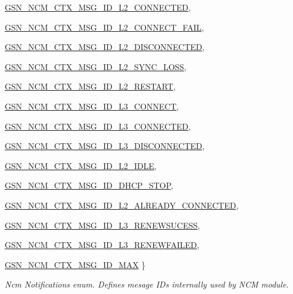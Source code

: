 \begin{DoxyCompactItemize}
\par
\hyperlink{a00688_gga7df8ae3172682e89bfa663208e3f0081ab7c2c3aa92aaa434c756acf574849d7e}{GSN\_\-NCM\_\-CTX\_\-MSG\_\-ID\_\-L2\_\-CONNECTED}, 
\par
\hyperlink{a00688_gga7df8ae3172682e89bfa663208e3f0081a3d625aa8bd3451c5d6756d7ca12a5a72}{GSN\_\-NCM\_\-CTX\_\-MSG\_\-ID\_\-L2\_\-CONNECT\_\-FAIL}, 
\par
\hyperlink{a00688_gga7df8ae3172682e89bfa663208e3f0081a6d6b2708ec053a54a35533ea89b82dbe}{GSN\_\-NCM\_\-CTX\_\-MSG\_\-ID\_\-L2\_\-DISCONNECTED}, 
\par
\hyperlink{a00688_gga7df8ae3172682e89bfa663208e3f0081a6d6969743dec280c81de97facc785085}{GSN\_\-NCM\_\-CTX\_\-MSG\_\-ID\_\-L2\_\-SYNC\_\-LOSS}, 
\par
\hyperlink{a00688_gga7df8ae3172682e89bfa663208e3f0081a5a1bac3915a3dc40cb070e75fdd809a0}{GSN\_\-NCM\_\-CTX\_\-MSG\_\-ID\_\-L2\_\-RESTART}, 
\par
\hyperlink{a00688_gga7df8ae3172682e89bfa663208e3f0081a6f85a2bfe3c47d23f9dd782d433383f4}{GSN\_\-NCM\_\-CTX\_\-MSG\_\-ID\_\-L3\_\-CONNECT}, 
\par
\hyperlink{a00688_gga7df8ae3172682e89bfa663208e3f0081a9645733074e6cf9524c08ecbafe78d78}{GSN\_\-NCM\_\-CTX\_\-MSG\_\-ID\_\-L3\_\-CONNECTED}, 
\par
\hyperlink{a00688_gga7df8ae3172682e89bfa663208e3f0081aab5e02a78811b59d9d996952c346681a}{GSN\_\-NCM\_\-CTX\_\-MSG\_\-ID\_\-L3\_\-DISCONNECTED}, 
\par
\hyperlink{a00688_gga7df8ae3172682e89bfa663208e3f0081a1a6bf8dbcf5fd9f73baedb3d92f37810}{GSN\_\-NCM\_\-CTX\_\-MSG\_\-ID\_\-L2\_\-IDLE}, 
\par
\hyperlink{a00688_gga7df8ae3172682e89bfa663208e3f0081ac37700bd992d190df8dfbe400d904996}{GSN\_\-NCM\_\-CTX\_\-MSG\_\-ID\_\-DHCP\_\-STOP}, 
\par
\hyperlink{a00688_gga7df8ae3172682e89bfa663208e3f0081a339e00a57d9d49209c486fa80fa3efb2}{GSN\_\-NCM\_\-CTX\_\-MSG\_\-ID\_\-L2\_\-ALREADY\_\-CONNECTED}, 
\par
\hyperlink{a00688_gga7df8ae3172682e89bfa663208e3f0081ae284cf6bfa63b7e17d6f074f24a8eed6}{GSN\_\-NCM\_\-CTX\_\-MSG\_\-ID\_\-L3\_\-RENEWSUCESS}, 
\par
\hyperlink{a00688_gga7df8ae3172682e89bfa663208e3f0081a997c45d4f40178db905d5099db419071}{GSN\_\-NCM\_\-CTX\_\-MSG\_\-ID\_\-L3\_\-RENEWFAILED}, 
\par
\hyperlink{a00688_gga7df8ae3172682e89bfa663208e3f0081a69add9c8fa35762c0fc5614ee77eaab3}{GSN\_\-NCM\_\-CTX\_\-MSG\_\-ID\_\-MAX}
 \}
\begin{DoxyCompactList}\small\item\em Ncm Notifications enum. Defines mesage IDs internally used by NCM module. \end{DoxyCompactList}\end{DoxyCompactItemize}
